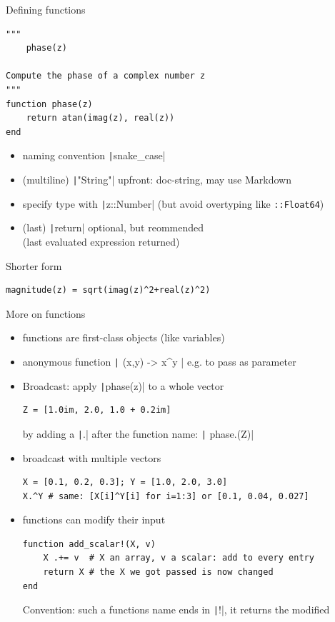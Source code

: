 \documentclass[aspectratio=169, 12pt]{beamer}
\begin{document}
    \begin{frame}[fragile]{Defining functions}
        \begin{verbatim}
"""
    phase(z)

Compute the phase of a complex number z
"""
function phase(z)
    return atan(imag(z), real(z))
end
        \end{verbatim}
        \begin{itemize}[<+->]
            \item \alert{naming convention} \texttt|snake_case|
            \item (multiline) \texttt|"String"| upfront: doc-string, may use  Markdown
            \item specify type with \texttt|z::Number| (but \alert{avoid} overtyping like \texttt{::Float64})
            \item (last) \texttt|return| optional, but reommended\\
            \hfill(last evaluated expression returned)
        \end{itemize}
    \pause
    Shorter form
    \begin{verbatim}
magnitude(z) = sqrt(imag(z)^2+real(z)^2)
    \end{verbatim}
    \end{frame}
    \begin{frame}[fragile]{More on functions}
        \begin{itemize}[<+->]
            \item functions are first-class objects (like variables)
            \item anonymous function \texttt|  (x,y) -> x^y  | e.g. to pass as parameter
            \item \alert{Broadcast}: apply \texttt|phase(z)| to a whole vector
            \begin{verbatim}
Z = [1.0im, 2.0, 1.0 + 0.2im]
            \end{verbatim}
            by adding a \texttt|.| after the function name: \texttt|    phase.(Z)|
            \item broadcast with multiple vectors
            \begin{verbatim}
X = [0.1, 0.2, 0.3]; Y = [1.0, 2.0, 3.0]
X.^Y # same: [X[i]^Y[i] for i=1:3] or [0.1, 0.04, 0.027]
            \end{verbatim}
            \item functions can modify their input
            \begin{verbatim}
function add_scalar!(X, v)
    X .+= v  # X an array, v a scalar: add to every entry
    return X # the X we got passed is now changed
end
            \end{verbatim}
            \alert{Convention:} such a functions name ends in \texttt|!|, it returns the modified
        \end{itemize}
    \end{frame}
\end{document}
